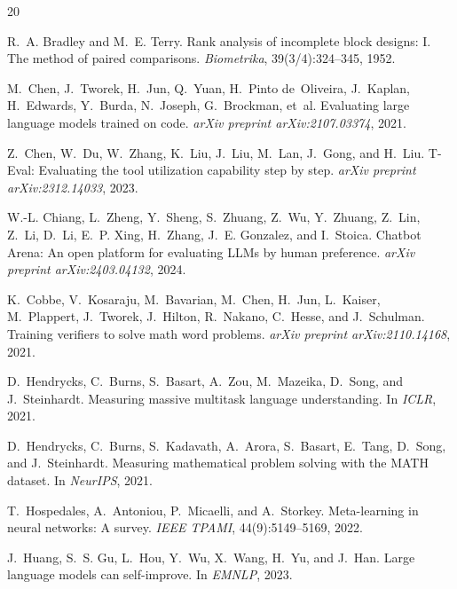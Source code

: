 \documentclass[11pt,a4paper]{article}
\begin{document}
\begin{thebibliography}{20}

R.~A. Bradley and M.~E. Terry.
\newblock Rank analysis of incomplete block designs: I. The method of paired comparisons.
\newblock \emph{Biometrika}, 39(3/4):324--345, 1952.

M.~Chen, J.~Tworek, H.~Jun, Q.~Yuan, H.~Pinto de~Oliveira, J.~Kaplan, H.~Edwards, Y.~Burda, N.~Joseph, G.~Brockman, et~al.
\newblock Evaluating large language models trained on code.
\newblock \emph{arXiv preprint arXiv:2107.03374}, 2021.

Z.~Chen, W.~Du, W.~Zhang, K.~Liu, J.~Liu, M.~Lan, J.~Gong, and H.~Liu.
\newblock T-Eval: Evaluating the tool utilization capability step by step.
\newblock \emph{arXiv preprint arXiv:2312.14033}, 2023.

W.-L. Chiang, L.~Zheng, Y.~Sheng, S.~Zhuang, Z.~Wu, Y.~Zhuang, Z.~Lin, Z.~Li, D.~Li, E.~P. Xing, H.~Zhang, J.~E. Gonzalez, and I.~Stoica.
\newblock Chatbot Arena: An open platform for evaluating LLMs by human preference.
\newblock \emph{arXiv preprint arXiv:2403.04132}, 2024.

K.~Cobbe, V.~Kosaraju, M.~Bavarian, M.~Chen, H.~Jun, L.~Kaiser, M.~Plappert, J.~Tworek, J.~Hilton, R.~Nakano, C.~Hesse, and J.~Schulman.
\newblock Training verifiers to solve math word problems.
\newblock \emph{arXiv preprint arXiv:2110.14168}, 2021.

D.~Hendrycks, C.~Burns, S.~Basart, A.~Zou, M.~Mazeika, D.~Song, and J.~Steinhardt.
\newblock Measuring massive multitask language understanding.
\newblock In \emph{ICLR}, 2021{}.

D.~Hendrycks, C.~Burns, S.~Kadavath, A.~Arora, S.~Basart, E.~Tang, D.~Song, and J.~Steinhardt.
\newblock Measuring mathematical problem solving with the MATH dataset.
\newblock In \emph{NeurIPS}, 2021{}.

T.~Hospedales, A.~Antoniou, P.~Micaelli, and A.~Storkey.
\newblock Meta-learning in neural networks: A survey.
\newblock \emph{IEEE TPAMI}, 44(9):5149--5169, 2022.

J.~Huang, S.~S. Gu, L.~Hou, Y.~Wu, X.~Wang, H.~Yu, and J.~Han.
\newblock Large language models can self-improve.
\newblock In \emph{EMNLP}, 2023.


\end{thebibliography}
\end{document}
